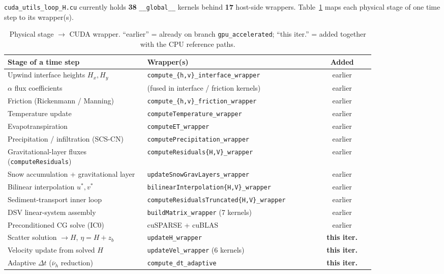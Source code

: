 \documentclass[11pt,a4paper]{article}
\begin{document}
\texttt{cuda\_utils\_loop\_H.cu} currently holds \textbf{38} \texttt{\_\_global\_\_}
kernels behind \textbf{17} host-side wrappers. Table~\ref{tab:kernels} maps each
physical stage of one time step to its wrapper(s).

\begin{table}[h]
\centering
\footnotesize
\setlength{\tabcolsep}{4pt}
\begin{tabular}{@{}p{0.38\linewidth}p{0.46\linewidth}c@{}}
\toprule
Stage of a time step & Wrapper(s) & Added \\
\midrule
Upwind interface heights $H_{x},H_{y}$      & \texttt{compute\_\{h,v\}\_interface\_wrapper} & earlier \\
$\alpha$ flux coefficients                  & (fused in interface / friction kernels) & earlier \\
Friction (Rickenmann / Manning)             & \texttt{compute\_\{h,v\}\_friction\_wrapper} & earlier \\
Temperature update                          & \texttt{computeTemperature\_wrapper} & earlier \\
Evapotranspiration                          & \texttt{computeET\_wrapper} & earlier \\
Precipitation / infiltration (SCS-CN)       & \texttt{computePrecipitation\_wrapper} & earlier \\
Gravitational-layer fluxes (\texttt{computeResiduals}) & \texttt{computeResiduals\{H,V\}\_wrapper} & earlier \\
Snow accumulation + gravitational layer     & \texttt{updateSnowGravLayers\_wrapper} & earlier \\
Bilinear interpolation $u^{*},v^{*}$        & \texttt{bilinearInterpolation\{H,V\}\_wrapper} & earlier \\
Sediment-transport inner loop              & \texttt{computeResidualsTruncated\{H,V\}\_wrapper} & earlier \\
DSV linear-system assembly                  & \texttt{buildMatrix\_wrapper} (7 kernels) & earlier \\
Preconditioned CG solve (IC0)              & cuSPARSE + cuBLAS & earlier \\
Scatter solution $\to H$, $\eta=H+z_b$     & \texttt{updateH\_wrapper} & \textbf{this iter.} \\
Velocity update from solved $H$            & \texttt{updateVel\_wrapper} (6 kernels) & \textbf{this iter.} \\
Adaptive $\Delta t$ ($\overline{\nu}_h$ reduction) & \texttt{compute\_dt\_adaptive} & \textbf{this iter.} \\
\bottomrule
\end{tabular}
\caption{Physical stage $\rightarrow$ CUDA wrapper. ``earlier'' = already on
branch \texttt{gpu\_accelerated}; ``this iter.'' = added together with the CPU
reference paths.}
\label{tab:kernels}
\end{table}
\end{document}
